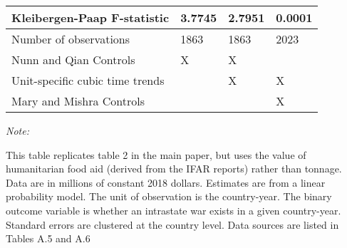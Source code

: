 \begin{table}
\begin{threeparttable}
\begin{tabular}[t]{llll}
\hspace{1em}Kleibergen-Paap F-statistic & 3.7745 & 2.7951 & 0.0001\\
\midrule
Number of observations & 1863 & 1863 & 2023\\
Nunn and Qian Controls & X & X & \\
Unit-specific cubic time trends &  & X & X\\
Mary and Mishra Controls &  &  & X\\
\bottomrule
\end{tabular}
\begin{tablenotes}[para]
\item \textit{Note: } 
\item This table replicates table 2 in the main paper, but uses the value of humanitarian food aid (derived from the IFAR reports) rather than tonnage. Data are in millions of constant 2018 dollars. Estimates are from a linear probability model. The unit of observation is the country-year. The binary outcome variable is whether an intrastate war exists in a given country-year. Standard errors are clustered at the country level. Data sources are listed in Tables A.5 and A.6
\end{tablenotes}
\end{threeparttable}
\end{table}
